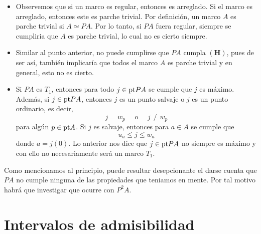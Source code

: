 \begin{itemize}
\item Observemos que si un marco es regular, entonces es arreglado. Si el marco es arreglado, entonces este es parche trivial. Por definición, un marco $A$ es parche trivial si $A\simeq PA$. Por lo tanto, si $PA$ fuera regular, siempre se cumpliria que $A$ es parche trivial, lo cual no es cierto siempre.
\item Similar al punto anterior, no puede cumplirse que $PA$ cumpla $\mathbf{(H)}$, pues de ser así, también implicaría que todos el marco $A$ es parche trivial y en general, esto no es cierto.
\item Si $PA$ es $T_1$, entonces para todo $j\in \mathrm{pt} PA$ se cumple que $j$ es máximo. Además, si $j\in \mathrm{pt} PA$, entonces $j$ es un punto salvaje o $j$ es un punto ordinario, es decir,
\[
j=w_p\quad \mbox{ o }\quad j\neq w_p
\]
para algún $p\in \mathrm{pt} A$. Si $j$ es salvaje, entonces para $a\in A$ se cumple que 
\[
u_a\leq j\leq w_a
\]
donde $a=j(0)$. Lo anterior nos dice que $j\in \mathrm{pt} PA$ no siempre es máximo y con ello no necesariamente será un marco $T_1$.
\end{itemize}

Como mencionamos al principio, puede resultar desepcionante el darse cuenta que $PA$ no cumple ninguna de las propiedades que teniamos en mente. Por tal motivo habrá que investigar que ocurre con $P^2A$.

\section{Intervalos de admisibilidad}
